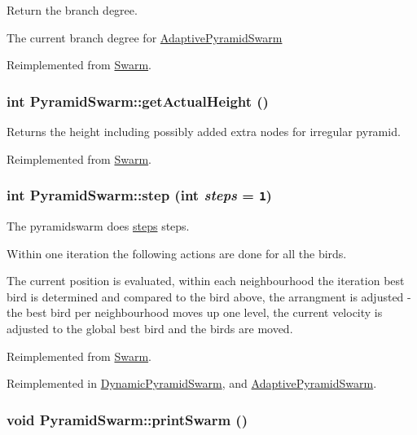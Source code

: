 Return the branch degree. 

The current branch degree for \hyperlink{classAdaptivePyramidSwarm}{AdaptivePyramidSwarm} 

Reimplemented from \hyperlink{classSwarm_c248592977868472b6874016ad273dbb}{Swarm}.\hypertarget{classPyramidSwarm_651f505aa4513559e87f2481ea259443}{
\subsubsection{\setlength{\rightskip}{0pt plus 5cm}int PyramidSwarm::getActualHeight ()}}
\label{classPyramidSwarm_651f505aa4513559e87f2481ea259443}


Returns the height including possibly added extra nodes for irregular pyramid. 



Reimplemented from \hyperlink{classSwarm_73a690fe6e3d6550098dc8ffc2f977c2}{Swarm}.\hypertarget{classPyramidSwarm_a9a21f0581b43dc3549fee12d6f2229e}{
\subsubsection{\setlength{\rightskip}{0pt plus 5cm}int PyramidSwarm::step (int {\em steps} = {\tt 1})}}
\label{classPyramidSwarm_a9a21f0581b43dc3549fee12d6f2229e}


The pyramidswarm does \hyperlink{runpso_8cpp_b4ae7205573977222eadd0795db193e2}{steps} steps. 

Within one iteration the following actions are done for all the birds.\par
 The current position is evaluated, within each neighbourhood the iteration best bird is determined and compared to the bird above, the arrangment is adjusted - the best bird per neighbourhood moves up one level, the current velocity is adjusted to the global best bird and the birds are moved. 

Reimplemented from \hyperlink{classSwarm_7ab61f9797ce80e2edfb2bd881d7147c}{Swarm}.

Reimplemented in \hyperlink{classDynamicPyramidSwarm_ffcde6a425fd052c0bd5a65124a204a1}{DynamicPyramidSwarm}, and \hyperlink{classAdaptivePyramidSwarm_0d2d0278504ad096f288d8efe5dbf360}{AdaptivePyramidSwarm}.\hypertarget{classPyramidSwarm_85ec37731cf16f817ae7523e890a267e}{
\subsubsection{\setlength{\rightskip}{0pt plus 5cm}void PyramidSwarm::printSwarm ()}}
\label{classPyramidSwarm_85ec37731cf16f817ae7523e890a267e}


